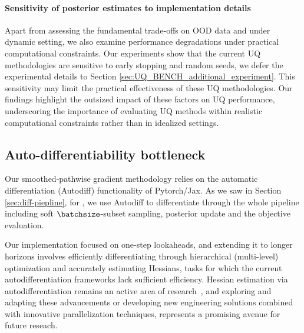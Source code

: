 \vspace{-10pt}
\paragraph{Sensitivity of posterior estimates to implementation details} Apart from assessing the fundamental trade-offs  on OOD data and under dynamic setting, we also examine performance degradations under practical computational constraints.
Our experiments show that the current UQ methodologies are sensitive to early stopping and random seeds, we defer the experimental details to Section \ref{sec:UQ_BENCH_additional_experiment}. This sensitivity may limit the practical effectiveness of these UQ methodologies.
Our findings highlight the outsized impact of these factors on UQ performance, underscoring the importance of evaluating UQ methods within realistic computational constraints rather than in idealized settings.



\subsection{Auto-differentiability bottleneck} 
\label{sec:auto-diff-bottleneck}
Our smoothed-pathwise gradient methodology relies on the automatic differentiation (Autodiff) functionality of Pytorch/Jax. As we saw in Section \ref{sec:diff-piepline}, for \ouralgo, we use Autodiff to differentiate through the whole pipeline including soft $\batchsize$-subset sampling, posterior update and the objective evaluation.



Our implementation focused on one-step lookaheads, and extending it to longer horizons  involves efficiently differentiating through hierarchical (multi-level) optimization and accurately estimating Hessians, tasks for which the current autodifferentiation frameworks lack sufficient efficiency. Hessian estimation via autodifferentiation remains an active area of research~\citep{BaydinPeRaSi17,ShabanChHaBo18,Margossian19,LorraineViDu20,Amos22,BlondelBeCuFrHoLlPeVe22, ScieurGiBePe22,Alesiani23,KotaryDiFi23}, and exploring and adapting these advancements or developing new engineering solutions combined with innovative parallelization techniques, represents a promising avenue for future reseach.

